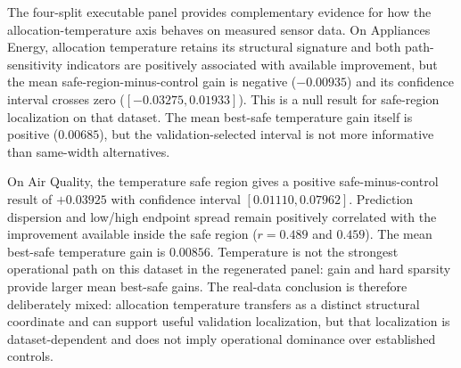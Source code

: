 \documentclass[preprint,12pt,authoryear]{elsarticle}
\begin{document}
\begin{table}[t]
\centering
\caption{Executable four-split real-world sensor benchmark summary. Appliances Energy yields a null safe-region-versus-control result, whereas Air Quality gives a positive result. Path indicators report the correlation of prediction dispersion and low/high endpoint spread with available best-safe improvement.}
\label{tab:real_world}
\end{table}

The four-split executable panel provides complementary evidence for how the allocation-temperature axis behaves on measured sensor data. On Appliances Energy, allocation temperature retains its structural signature and both path-sensitivity indicators are positively associated with available improvement, but the mean safe-region-minus-control gain is negative ($-0.00935$) and its confidence interval crosses zero ($[-0.03275,0.01933]$). This is a null result for safe-region localization on that dataset. The mean best-safe temperature gain itself is positive ($0.00685$), but the validation-selected interval is not more informative than same-width alternatives.

On Air Quality, the temperature safe region gives a positive safe-minus-control result of $+0.03925$ with confidence interval $[0.01110,0.07962]$. Prediction dispersion and low/high endpoint spread remain positively correlated with the improvement available inside the safe region ($r=0.489$ and $0.459$). The mean best-safe temperature gain is $0.00856$. Temperature is not the strongest operational path on this dataset in the regenerated panel: gain and hard sparsity provide larger mean best-safe gains. The real-data conclusion is therefore deliberately mixed: allocation temperature transfers as a distinct structural coordinate and can support useful validation localization, but that localization is dataset-dependent and does not imply operational dominance over established controls.
\end{document}
